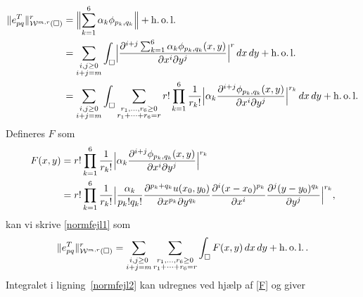 \begin{equation} \label{normfejl1}
\begin{split}
  \|e_{pq}^T\|_{{\mathcal W}^{m,r}(\Box)}^r &= \Bigl\| \sum_{k=1}^6 \alpha_k
  \phi_{p_k,q_k} \Bigr\| + \operatorname{h.o.l.} \\
  &= \sum_{\substack{ i,j\geq 0 \\ i+j=m }} \int_\Box \Bigl|
  \frac{\partial^{i+j}\sum_{k=1}^6 \alpha_k \phi_{p_k,q_k}(x,y)}
  {\partial x^i \partial y^j} \Bigr|^r\, dx\, dy + \operatorname{h.o.l.} \\
  &= \sum_{\substack{ i,j\geq 0 \\ i+j=m }}
  \int_\Box \sum_{\substack{ r_1,\ldots ,r_6 \geq 0 \\ r_1+\cdots +r_6=r}} 
  r! \prod_{k=1}^{6} \frac{1}{r_k!}
  \Bigl| \alpha_k \frac{\partial^{i+j} \phi_{p_k,q_k}(x,y)}
  {\partial x^i \partial y^j} \Bigr|^{r_k}\, dx\, dy + \operatorname{h.o.l.} \\
\end{split}
\end{equation}
Defineres $F$ som
\begin{equation} \label{F}
\begin{split}
  F(x,y) &= r! \prod_{k=1}^{6} \frac{1}{r_k!}
  \Bigl| \alpha_k \frac{\partial^{i+j} \phi_{p_k,q_k}(x,y)}
  {\partial x^i \partial y^j} \Bigr|^{r_k} \\
  &=  r! \prod_{k=1}^{6} \frac{1}{r_k!}
  \Bigl| \frac{\alpha_k}{p_k!q_k!}
  \frac{\partial^{p_k+q_k} u(x_0,y_0)}{\partial x^{p_k} \partial y^{q_k}}
  \frac{\partial^i(x-x_0)^{p_k}}{\partial x^i}
  \frac{\partial^j(y-y_0)^{q_k}}{\partial y^j} \Bigr|^{r_k}, \\
\end{split}
\end{equation}
kan vi skrive \eqref{normfejl1} som
\begin{equation} \label{normfejl2}
  \|e_{pq}^T\|_{{\mathcal W}^{m,r}(\Box)}^r = \sum_{\substack{ i,j\geq 0 \\ i+j=m }}
  \sum_{\substack{ r_1,\ldots ,r_6 \geq 0\\ r_1+\cdots +r_6=r}}
  \int_\Box F(x,y)\, dx\, dy + \operatorname{h.o.l.} .
\end{equation}
Integralet i ligning~\eqref{normfejl2} kan udregnes ved hjælp af
\eqref{F} og giver
